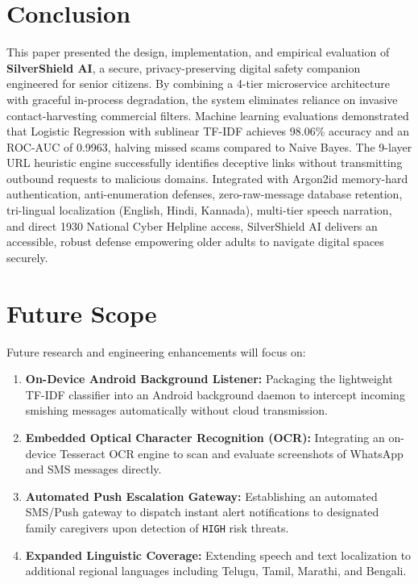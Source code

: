 \documentclass[conference]{IEEEtran}
\begin{document}
\section{Conclusion}
This paper presented the design, implementation, and empirical evaluation of \textbf{SilverShield AI}, a secure, privacy-preserving digital safety companion engineered for senior citizens. By combining a 4-tier microservice architecture with graceful in-process degradation, the system eliminates reliance on invasive contact-harvesting commercial filters. Machine learning evaluations demonstrated that Logistic Regression with sublinear TF-IDF achieves 98.06\% accuracy and an ROC-AUC of 0.9963, halving missed scams compared to Naive Bayes. The 9-layer URL heuristic engine successfully identifies deceptive links without transmitting outbound requests to malicious domains. Integrated with Argon2id memory-hard authentication, anti-enumeration defenses, zero-raw-message database retention, tri-lingual localization (English, Hindi, Kannada), multi-tier speech narration, and direct 1930 National Cyber Helpline access, SilverShield AI delivers an accessible, robust defense empowering older adults to navigate digital spaces securely.

\section{Future Scope}
Future research and engineering enhancements will focus on:
\begin{enumerate}
    \item \textbf{On-Device Android Background Listener:} Packaging the lightweight TF-IDF classifier into an Android background daemon to intercept incoming smishing messages automatically without cloud transmission.
    \item \textbf{Embedded Optical Character Recognition (OCR):} Integrating an on-device Tesseract OCR engine to scan and evaluate screenshots of WhatsApp and SMS messages directly.
    \item \textbf{Automated Push Escalation Gateway:} Establishing an automated SMS/Push gateway to dispatch instant alert notifications to designated family caregivers upon detection of \texttt{HIGH} risk threats.
    \item \textbf{Expanded Linguistic Coverage:} Extending speech and text localization to additional regional languages including Telugu, Tamil, Marathi, and Bengali.
\end{enumerate}
\end{document}
